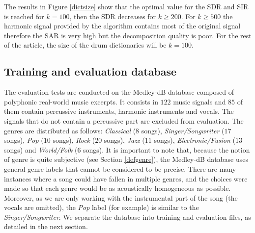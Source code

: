 \documentclass{article}
\begin{document}
The results in Figure \ref{dictsize} show that the optimal value for the SDR and SIR is reached for $k=100$, then the SDR decreases for $k\geqslant 200$. For $k\geqslant 500$ the harmonic signal provided by the algorithm contains most of the original signal therefore the SAR is very high but the decomposition quality is poor. For the rest of the article, the size of the drum dictionaries will be $k=100$.

\subsection{Training and evaluation database}\label{database}

The evaluation tests are conducted on the Medley-dB database \cite{bittner2014medleydb} composed of polyphonic real-world music excerpts. It consists in $122$ music signals and $85$ of them contain percussive instruments, harmonic instruments and vocals. The signals that do not contain a percussive part are excluded from evaluation. The genres are distributed as follows: \emph{Classical} ($8$ songs), \emph{Singer/Songwriter} ($17$ songs), \emph{Pop} ($10$ songs), \emph{Rock} ($20$ songs), \emph{Jazz} ($11$ songs), \emph{Electronic/Fusion} ($13$ songs) and \emph{World/Folk} ($6$ songs). It is important to note that, because the notion of genre is quite subjective (see Section \ref{defgenre}), the Medley-dB database uses general genre labels that cannot be considered to be precise. There are many instances where a song could have fallen in multiple genres, and the choices were made so that each genre would be as acoustically homogeneous as possible. Moreover, as we are only working with the instrumental part of the song (the vocals are omitted), the \emph{Pop} label (for example) is similar to the \emph{Singer/Songwriter}. We separate the database into training and evaluation files, as detailed in the next section. 
\end{document}
